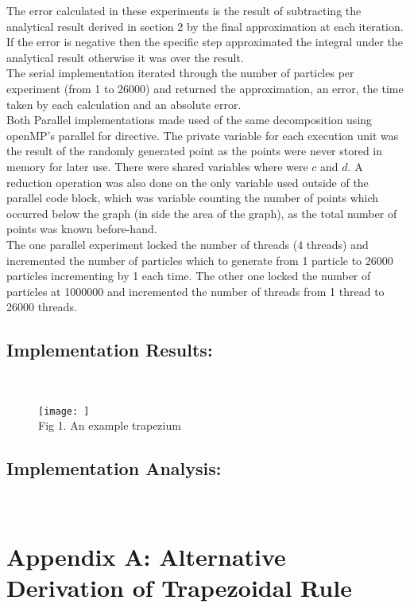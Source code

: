 \documentclass[11pt]{article}
\begin{document}
\begin{page}
\noindent The error calculated in these experiments is the result of subtracting the analytical result derived in section 2 by the final approximation at each iteration. If the error is negative then the specific step approximated the integral under the analytical result otherwise it was over the result.\\

\noindent The serial implementation iterated through the number of particles per experiment (from 1 to 26000) and returned the approximation, an error, the time taken by each calculation and an absolute error.\\

\noindet Both Parallel implementations made used of the same decomposition using openMP's parallel for directive. The private variable for each execution unit was the result of the randomly generated point as the points were never stored in memory for later use. There were shared variables where were $c$ and $d$. A reduction operation was also done on the only variable used outside of the parallel code block, which was variable counting the number of points which occurred below the graph (in side the area of the graph), as the total number of points was known before-hand.\\

\noindent The one parallel experiment locked the number of threads (4 threads) and incremented the number of particles which to generate from 1 particle to 26000 particles incrementing by 1 each time. The other one locked the number of particles at 1000000 and incremented the number of threads from 1 thread to 26000 threads.


\subsection{Implementation Results:}\\
\begin{figure}[ht]
\centering
     \texttt{[image: ]}\\
     Fig 1. An example trapezium
\end{figure}

\subsection{Implementation Analysis:}\\ 


\break
\section{Appendix A: Alternative Derivation of Trapezoidal Rule}

\end{page}
\end{document}
